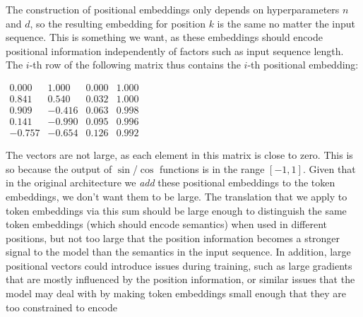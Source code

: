 \documentclass[11pt,a4paper]{article}
\begin{document}
\begin{enumerate}[label=(\alph*)]
\begin{enumerate}[label=(\roman*)]
                    The construction of positional embeddings only depends on
                    hyperparameters $n$ and $d$, so the resulting embedding for
                    position $k$ is the same no matter the input sequence.
                    This is something we want, as these embeddings should
                    encode positional information independently of factors such
                    as input sequence length.
                    The $i$-th row of the following matrix thus contains the
                    $i$-th positional embedding:
                    \begin{center}
                        $\begin{matrix}
                                0.000  & 1.000  & 0.000 & 1.000 \\
                                0.841  & 0.540  & 0.032 & 1.000 \\
                                0.909  & -0.416 & 0.063 & 0.998 \\
                                0.141  & -0.990 & 0.095 & 0.996 \\
                                -0.757 & -0.654 & 0.126 & 0.992
                            \end{matrix}$
                    \end{center}
                    The vectors are not large, as each element in this matrix is
                    close to zero.
                    This is so because the output of $\sin$/$\cos$ functions is
                    in the range $[-1,1]$.
                    Given that in the original architecture we \emph{add} these
                    positional embeddings to the token embeddings, we don't want
                    them to be large.
                    The translation that we apply to token embeddings via this
                    sum should be large enough to distinguish the same token
                    embeddings (which should encode semantics) when used in
                    different positions, but not too large that the position
                    information becomes a stronger signal to the model than the
                    semantics in the input sequence.
                    In addition, large positional vectors could introduce issues
                    during training, such as large gradients that are mostly
                    influenced by the position information, or similar issues
                    that the model may deal with by making token embeddings
                    small enough that they are too constrained to encode

\end{enumerate}
\end{enumerate}
\end{document}
